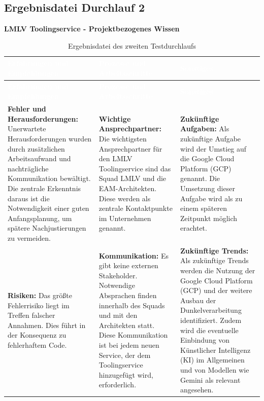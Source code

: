 \documentclass[
  10pt,
  ngerman,
  a4paper,
  toc=graduated,
  numbers=noenddot,
  headings=standardclasses,
  nonumberlist
]{scrartcl}
\renewcommand{\arraystretch}{1.0}
\begin{document}
\newpage
\subsection{Ergebnisdatei Durchlauf 2}
\label{anhang_ergebnisdatei_durchlauf_2}

\noindent\textbf{LMLV Toolingservice - Projektbezogenes Wissen}

\vspace{0.5cm}

{
\setlength{\tabcolsep}{4pt}
\renewcommand{\arraystretch}{1.15}

\begin{longtable}{|L{0.31\textwidth}|L{0.31\textwidth}|L{0.31\textwidth}|}
\caption{Ergebnisdatei des zweiten Testdurchlaufs}
\label{tab:ergebnisdatei_durchlauf_2}\\
\hline
{}
\textcolor{white}{\textbf{Erfahrungen und Empfehlungen}} &
\textcolor{white}{\textbf{Prozesse und Arbeitsschritte}} &
\textcolor{white}{\textbf{Sonstiges}} \\
\hline
\endfirsthead

\hline
{}
\textcolor{white}{\textbf{Erfahrungen und Empfehlungen}} &
\textcolor{white}{\textbf{Prozesse und Arbeitsschritte}} &
\textcolor{white}{\textbf{Sonstiges}} \\
\hline
\endhead

\textbf{Fehler und Herausforderungen:}\newline
Unerwartete Herausforderungen wurden durch zusätzlichen Arbeitsaufwand und nachträgliche Kommunikation bewältigt. Die zentrale Erkenntnis daraus ist die Notwendigkeit einer guten Anfangsplanung, um spätere Nachjustierungen zu vermeiden.
&
\textbf{Wichtige Ansprechpartner:}\newline
Die wichtigsten Ansprechpartner für den LMLV Toolingservice sind das Squad LMLV und die EAM-Architekten. Diese werden als zentrale Kontaktpunkte im Unternehmen genannt.
&
\textbf{Zukünftige Aufgaben:}\newline
Als zukünftige Aufgabe wird der Umstieg auf die Google Cloud Platform (GCP) genannt. Die Umsetzung dieser Aufgabe wird als zu einem späteren Zeitpunkt möglich erachtet.
\\
\hline

\textbf{Risiken:}\newline
Das größte Fehlerrisiko liegt im Treffen falscher Annahmen. Dies führt in der Konsequenz zu fehlerhaftem Code.
&
\textbf{Kommunikation:}\newline
Es gibt keine externen Stakeholder. Notwendige Absprachen finden innerhalb des Squads und mit den Architekten statt. Diese Kommunikation ist bei jedem neuen Service, der dem Toolingservice hinzugefügt wird, erforderlich.
&
\textbf{Zukünftige Trends:}\newline
Als zukünftige Trends werden die Nutzung der Google Cloud Platform (GCP) und der weitere Ausbau der Dunkelverarbeitung identifiziert. Zudem wird die eventuelle Einbindung von Künstlicher Intelligenz (KI) im Allgemeinen und von Modellen wie Gemini als relevant angesehen.
\\
\hline


\end{longtable}}
\end{document}
